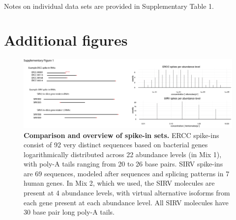 Notes on individual data sets are provided in Supplementary Table 1.

\section{Additional figures}

\begin{figure}
    \centering
    \includegraphics[width=\textwidth]{"Supp Figure 1"}
    \caption[Comparison and overview of spike-in sets]{\textbf{Comparison and overview of spike-in sets.} ERCC spike-ins consist of 92 very distinct sequences based on bacterial genes logarithmically distributed across 22 abundance levels (in Mix 1), with poly-A tails ranging from 20 to 26 base pairs. SIRV spike-ins are 69 sequences, modeled after sequences and splicing patterns in 7 human genes. In Mix 2, which we used, the SIRV molecules are present at 4 abundance levels, with virtual alternative isoforms from each gene present at each abundance level. All SIRV molecules have 30 base pair long poly-A tails.}
    \label{fig:spikeins}
\end{figure}

